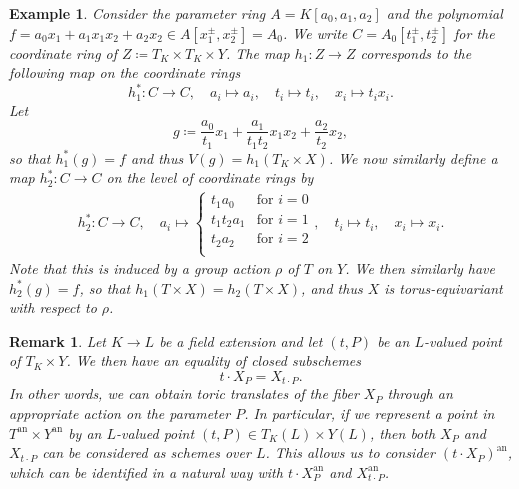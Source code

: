 \documentclass[12pt,reqno,a4paper]{amsart}
\theoremstyle{theoremstyle}
\theoremstyle{examplestyle}
\newtheorem{example}[theorem]{Example}
\newtheorem{remark}[theorem]{Remark}
\theoremstyle{algorithmstyle}
\newcommand{\an}{{\mathrm{an}}}
\begin{document}
\begin{example}
  Consider the parameter ring $A=K[a_{0},a_{1},a_{2}]$ and the polynomial $f=a_{0}x_1+a_{1}x_{1}x_{2}+a_{2}x_{2}\in A[x_{1}^{\pm},x_{2}^{\pm}]=A_{0}$. We write $C=A_{0}[t_{1}^{\pm},t_{2}^{\pm}]$ for the coordinate ring of $Z\coloneqq T_K\times T_K\times Y$. The map $h_{1}\colon Z\to Z$ corresponds to the following map on the coordinate rings
  \begin{equation*}
    h^{*}_{1}\colon C\to C,\quad a_i\mapsto a_i, \quad t_i\mapsto t_i, \quad x_i\mapsto t_{i}x_i.
  \end{equation*}
  Let
  \begin{equation*}
    g\coloneqq \dfrac{a_{0}}{t_{1}}x_1+\dfrac{a_{1}}{t_{1}t_{2}}x_{1}x_{2}+\dfrac{a_{2}}{t_{2}}x_{2},
  \end{equation*}
  so that $h^{*}_{1}(g)=f$ and thus $V(g)=h_{1}(T_K\times X)$. We now similarly define a map $h^{*}_{2}:C\to C$  on the level of coordinate rings by
  \begin{align*}
    h^{*}_{2}\colon C\to C,\quad a_{i}\mapsto
    \begin{cases}
      t_{1}a_{0}&\text{for }i=0\\
      t_{1}t_{2}a_{1}&\text{for }i=1\\
      t_{2}a_{2}&\text{for }i=2\\
    \end{cases}
    , \quad t_i\mapsto t_i, \quad x_i\mapsto x_i.
  \end{align*}
  Note that this is induced by a group action $\rho$ of $T$ on $Y$. We then similarly have $h^{*}_{2}(g)=f$, so that $h_{1}(T\times X)=h_{2}(T\times X)$, and thus $X$ is torus-equivariant with respect to $\rho$. %
\end{example}

\begin{remark}
  Let $K\to L$ be a field extension and let $(t,P)$ be an $L$-valued point of $T_K\times Y$. We then have an equality of closed subschemes
  \begin{equation*}
    t\cdot X_{P}=X_{t\cdot P}.
  \end{equation*}
  In other words, we can obtain toric translates of the fiber $X_P$ through an appropriate action on the parameter $P$. In particular, if we represent
  a point in $T^{\an}\times Y^{\an}$ by an $L$-valued point $(t,P)\in T_{K}(L)\times Y(L)$, then both $X_{P}$ and $X_{t\cdot P}$ can be considered as schemes over $L$. This allows us to consider $(t\cdot X_{P})^{\an}$, which can be identified in a natural way with $t\cdot X^{\an}_{P}$ and $X^{\an}_{t\cdot P}$.   %
\end{remark}
\end{document}
